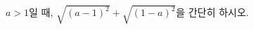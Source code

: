 \hspace*{2mm}\begin{minipage}[t]{\dimexpr\linewidth-2mm\relax}\vspace{0pt}
$a>1$일 때, $\sqrt{(a-1)^2}+\sqrt{(1-a)^2}$을 간단히 하시오.\end{minipage}
